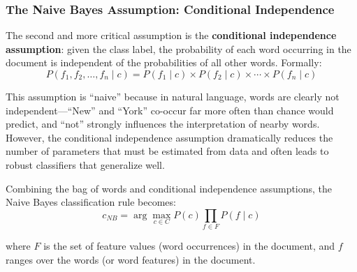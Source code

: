 \documentclass[11pt,a4paper]{article}
\begin{document}
\subsubsection{The Naive Bayes Assumption: Conditional Independence}

The second and more critical assumption is the \textbf{conditional independence assumption}: given the class label, the probability of each word occurring in the document is independent of the probabilities of all other words. Formally:
\[
P(f_1, f_2, \ldots, f_n \mid c) = P(f_1 \mid c) \times P(f_2 \mid c) \times \cdots \times P(f_n \mid c)
\]

This assumption is ``naive'' because in natural language, words are clearly not independent---``New'' and ``York'' co-occur far more often than chance would predict, and ``not'' strongly influences the interpretation of nearby words. However, the conditional independence assumption dramatically reduces the number of parameters that must be estimated from data and often leads to robust classifiers that generalize well.

Combining the bag of words and conditional independence assumptions, the Naive Bayes classification rule becomes:
\[
c_{NB} = \arg\max_{c \in C} P(c) \prod_{f \in F} P(f \mid c)
\]

where $F$ is the set of feature values (word occurrences) in the document, and $f$ ranges over the words (or word features) in the document.
\end{document}
